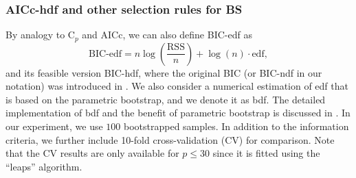 \subsubsection{AICc-hdf and other selection rules for BS}
\label{sec:bs_ic_simulationresults}
By analogy to C$_p$ and AICc, we can also define BIC-edf as
\begin{equation}
\text{BIC-edf} = n \log\left(\frac{\text{RSS}}{n}\right) + \log(n) \cdot \text{edf},
\label{eq:bic_edf}
\end{equation}
and its feasible version BIC-hdf, where the original BIC (or BIC-ndf in our notation) was introduced in \citet{schwarz1978estimating}. We also consider a numerical estimation of edf that is based on the parametric bootstrap, and we denote it as bdf. The detailed implementation of bdf and the benefit of parametric bootstrap is discussed in \citet{Efron2004}. In our experiment, we use $100$ bootstrapped samples. In addition to the information criteria, we further include 10-fold cross-validation (CV) for comparison. Note that the CV results are only available for $p \le 30$ since it is fitted using the ``leaps'' algorithm.

